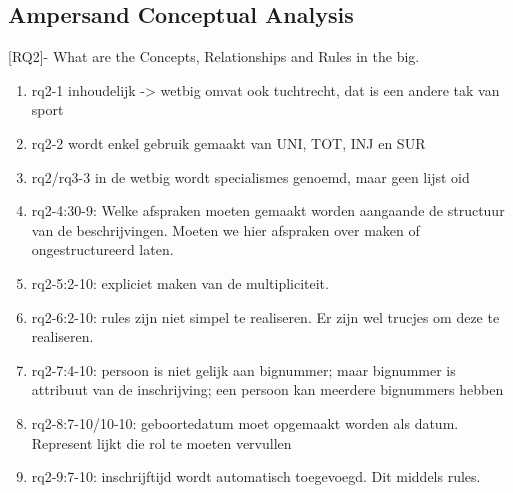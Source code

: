 \subsection{Ampersand Conceptual Analysis}
[RQ2]- What are the Concepts, Relationships and Rules in the \acrshort{big}.
\begin{enumerate}
    \item rq2-1 inhoudelijk -> wetbig omvat ook tuchtrecht, dat is een andere tak van sport
    \item rq2-2 wordt enkel gebruik gemaakt van UNI, TOT, INJ en SUR
    \item rq2/rq3-3 in de wetbig wordt specialismes genoemd, maar geen lijst oid
    \item rq2-4:30-9: Welke afspraken moeten gemaakt worden aangaande de structuur van de beschrijvingen. 
    Moeten we hier afspraken over maken of ongestructureerd laten.
    \item rq2-5:2-10: expliciet maken van de multipliciteit.
    \item rq2-6:2-10: rules zijn niet simpel te realiseren. Er zijn wel trucjes om deze te realiseren.
    \item rq2-7:4-10: persoon is niet gelijk aan bignummer; maar bignummer is attribuut van de inschrijving; een persoon kan meerdere bignummers hebben
    \item rq2-8:7-10/10-10: geboortedatum moet opgemaakt worden als datum. Represent lijkt die rol te moeten vervullen
    \item rq2-9:7-10: inschrijftijd wordt automatisch toegevoegd. Dit middels rules.
\end{enumerate}
